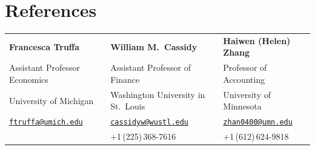 \documentclass[letterpaper,11pt]{article}
\begin{document}
\section{References}
\begin{tabularx}{\textwidth}{@{}X X X@{}}
  \textbf{Francesca Truffa} & \textbf{William M.\ Cassidy} & \textbf{Haiwen (Helen) Zhang} \\
  Assistant Professor Economics & Assistant Professor of Finance & Professor of Accounting \\
  University of Michigan & Washington University in St.\ Louis & University of Minnesota \\
  \href{mailto:ftruffa@umich.edu }{\texttt{ftruffa@umich.edu}} &
  \href{mailto:cassidyw@wustl.edu}{\texttt{cassidyw@wustl.edu}} &
  \href{mailto:zhan0400@umn.edu}{\texttt{zhan0400@umn.edu}} \\
  & +1\,(225)\,368-7616 & +1\,(612)\,624-9818 \\
\end{tabularx}
\end{document}
